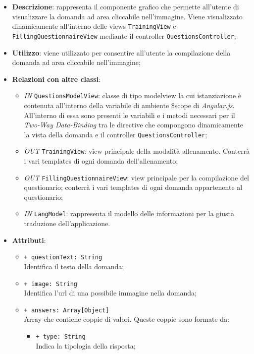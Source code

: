 		\begin{itemize}
			\item \textbf{Descrizione}: rappresenta il componente grafico che permette all'utente di visualizzare la domanda ad area cliccabile nell'immagine. Viene visualizzato dinamicamente all'interno delle views \texttt{TrainingView} e \texttt{FillingQuestionnaireView} mediante il controller \texttt{QuestionsController};
			\item \textbf{Utilizzo}: viene utilizzato per consentire all'utente la compilazione della domanda ad area cliccabile nell'immagine;
			\item \textbf{Relazioni con altre classi}: 
			\begin{itemize}
				\item \textit{IN} \texttt{QuestionsModelView}: classe di tipo modelview la cui istanziazione è contenuta all'interno della variabile di ambiente \$scope di \textit{Angular.js}. All'interno di essa sono presenti le variabili e i metodi necessari per il \textit{Two-Way Data-Binding} tra le directive che compongono dinamicamente la vista della domanda e il controller \texttt{QuestionsController};
				\item \textit{OUT} \texttt{TrainingView}: view principale della modalità allenamento. Conterrà i vari templates di ogni domanda dell'allenamento;
				\item \textit{OUT} \texttt{FillingQuestionnaireView}: view principale per la compilazione del questionario; conterrà i vari templates di ogni domanda appartenente al questionario;   
				\item \textit{IN} \texttt{LangModel}: rappresenta il modello delle informazioni per la giusta traduzione dell'applicazione.				
			\end{itemize}
			\item \textbf{Attributi}: 
				\begin{itemize}
					\item \texttt{+ questionText: String} \\ Identifica il testo della domanda;
					\item \texttt{+ image: String} \\ Identifica l'url di una possibile immagine nella domanda;
					\item \texttt{+ answers: Array[Object]} \\ Array che contiene coppie di valori. Queste coppie sono formate da:
					\begin{itemize}
						\item \texttt{+ type: String} \\ Indica la tipologia della risposta;

\end{itemize}
\end{itemize}
\end{itemize}
